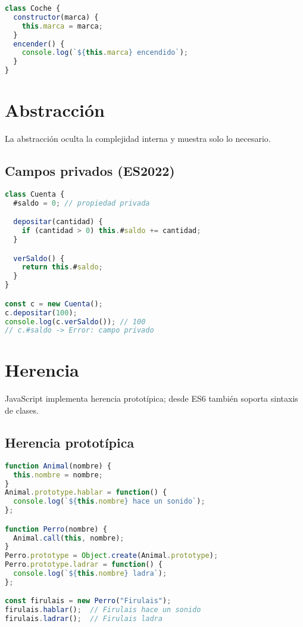 \documentclass[12pt]{article}
\begin{document}
\begin{lstlisting}[language=JavaScript]
class Coche {
  constructor(marca) {
    this.marca = marca;
  }
  encender() {
    console.log(`${this.marca} encendido`);
  }
}
\end{lstlisting}

\section{Abstracción}

La abstracción oculta la complejidad interna y muestra solo lo necesario.

\subsection*{Campos privados (ES2022)}

\begin{lstlisting}[language=JavaScript]
class Cuenta {
  #saldo = 0; // propiedad privada

  depositar(cantidad) {
    if (cantidad > 0) this.#saldo += cantidad;
  }

  verSaldo() {
    return this.#saldo;
  }
}

const c = new Cuenta();
c.depositar(100);
console.log(c.verSaldo()); // 100
// c.#saldo -> Error: campo privado
\end{lstlisting}

\section{Herencia}

JavaScript implementa herencia prototípica; desde ES6 también soporta sintaxis de clases.

\subsection*{Herencia prototípica}

\begin{lstlisting}[language=JavaScript]
function Animal(nombre) {
  this.nombre = nombre;
}
Animal.prototype.hablar = function() {
  console.log(`${this.nombre} hace un sonido`);
};

function Perro(nombre) {
  Animal.call(this, nombre);
}
Perro.prototype = Object.create(Animal.prototype);
Perro.prototype.ladrar = function() {
  console.log(`${this.nombre} ladra`);
};

const firulais = new Perro("Firulais");
firulais.hablar();  // Firulais hace un sonido
firulais.ladrar();  // Firulais ladra
\end{lstlisting}
\end{document}
